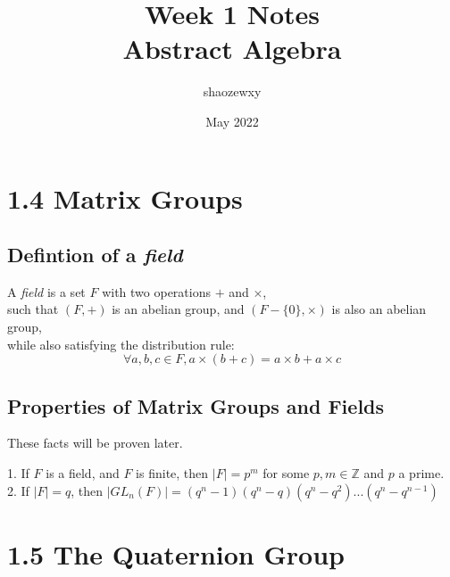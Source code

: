 \documentclass{article}
\title{Week 1 Notes\\
\large{Abstract Algebra}}
\author{shaozewxy }
\date{May 2022}
\begin{document}
\maketitle

\setcounter{secnumdepth}{0}
\section{1.4 Matrix Groups}
\subsection{Defintion of a \textit{field}}
\begin{addmargin}[1em]{0em}
A \textit{field} is a set $F$ with two operations $+$ and $\times$,\\
such that $(F,+)$ is an abelian group, and $(F-\{0\}, \times)$ is also an abelian group,\\
while also satisfying the distribution rule:
\begin{equation*}
\forall a,b,c \in F, a\times(b+c) = a\times b+a\times c
\end{equation*}
\end{addmargin}
\subsection{Properties of Matrix Groups and Fields}
These facts will be proven later.
\begin{addmargin}[1em]{0em}
1. If $F$ is a field, and $F$ is finite, then $|F| = p^m$ for some $p, m \in \mathbb{Z}$ and $p$ a prime.\\
2. If $|F| = q$, then $|GL_n(F)| = (q^n-1)(q^n-q)(q^n-q^2)...(q^n-q^{n-1})$
\end{addmargin}

\section{1.5 The Quaternion Group}
\end{document}
